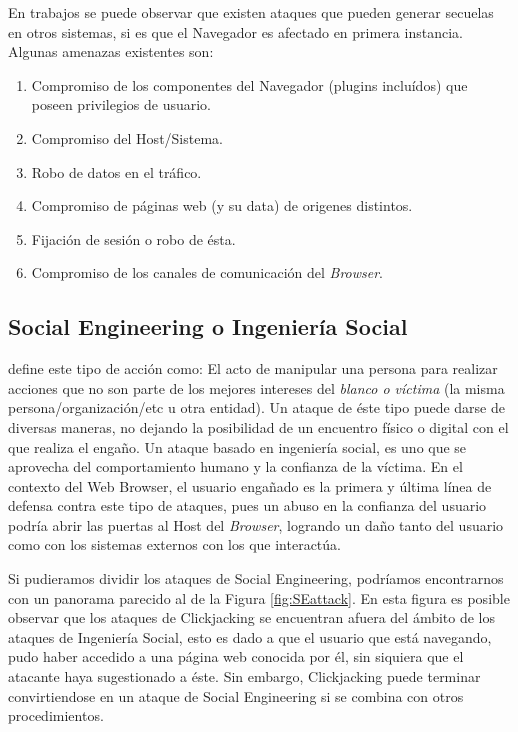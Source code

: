 En trabajos \cite{barth2008security, FirefoxThreatModel} se puede observar que existen ataques que pueden generar secuelas en otros sistemas, si es que el Navegador es afectado en primera instancia. Algunas amenazas existentes son:

\begin{enumerate}
	\item Compromiso de los componentes del Navegador (plugins incluídos) que poseen privilegios de usuario.
	\item Compromiso del Host/Sistema.
	\item Robo de datos en el tráfico.
	\item Compromiso de páginas web (y su data) de origenes distintos.
	\item Fijación de sesión o robo de ésta.
	\item Compromiso de los canales de comunicación del \textit{Browser}.
\end{enumerate}

\subsection{Social Engineering o Ingeniería Social}
\cite{socEngineeering} define este tipo de acción como: El acto de manipular una persona para realizar acciones que no son parte de los mejores intereses del \textit{blanco o víctima} (la misma persona/organización/etc u otra entidad). Un ataque de éste tipo puede darse de diversas maneras, no dejando la posibilidad de un encuentro físico o digital con el que realiza el engaño. Un ataque basado en ingeniería social, es uno que se aprovecha del comportamiento humano y la confianza de la víctima. En el contexto del Web Browser, el usuario engañado es la primera y última línea de defensa contra este tipo de ataques, pues un abuso en la confianza del usuario podría abrir las puertas al Host del \textit{Browser}, logrando un daño tanto del usuario como con los sistemas externos con los que interactúa.

Si pudieramos dividir los ataques de Social Engineering, podríamos encontrarnos con un panorama parecido al de la Figura \ref{fig:SEattack}. En esta figura es posible observar que los ataques de Clickjacking se encuentran afuera del ámbito de los ataques de  Ingeniería Social, esto es dado a que el usuario que está navegando, pudo haber accedido a una página web conocida por él, sin siquiera que el atacante haya sugestionado a éste. Sin embargo, Clickjacking puede terminar convirtiendose en un ataque de Social Engineering si se combina con otros procedimientos.

